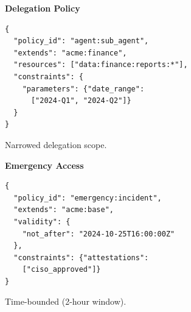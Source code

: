 {\vspace{0.5em}
\noindent\begin{minipage}[t]{0.48\columnwidth}
\textbf{Delegation Policy}
\begin{lstlisting}[basicstyle=\ttfamily\scriptsize]
{
  "policy_id": "agent:sub_agent",
  "extends": "acme:finance",
  "resources": ["data:finance:reports:*"],
  "constraints": {
    "parameters": {"date_range":
      ["2024-Q1", "2024-Q2"]}
  }
}
\end{lstlisting}
Narrowed delegation scope.
\end{minipage}
\hfill
\begin{minipage}[t]{0.48\columnwidth}
\textbf{Emergency Access}
\begin{lstlisting}[basicstyle=\ttfamily\scriptsize]
{
  "policy_id": "emergency:incident",
  "extends": "acme:base",
  "validity": {
    "not_after": "2024-10-25T16:00:00Z"
  },
  "constraints": {"attestations":
    ["ciso_approved"]}
}
\end{lstlisting}
Time-bounded (2-hour window).
\end{minipage}
}
